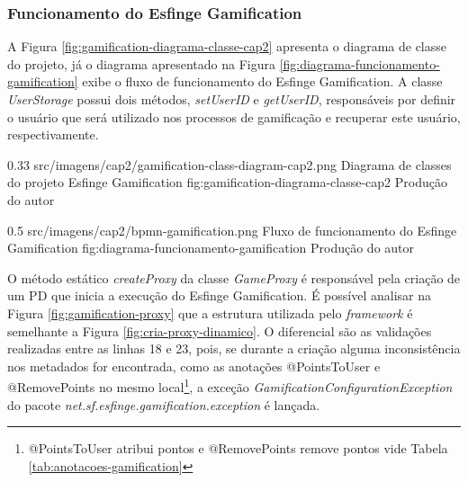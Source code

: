 \subsubsection{Funcionamento do Esfinge Gamification}

\par A Figura \ref{fig:gamification-diagrama-classe-cap2} apresenta o diagrama de classe do projeto, já o diagrama apresentado na Figura \ref{fig:diagrama-funcionamento-gamification} exibe o fluxo de funcionamento do Esfinge Gamification. A classe \textit{UserStorage} possui dois métodos, \textit{setUserID} e \textit{getUserID}, responsáveis por definir o usuário que será utilizado nos processos de gamificação e recuperar este usuário, respectivamente.

\begin{image}
{0.33} %
{src/imagens/cap2/gamification-class-diagram-cap2.png} %
{Diagrama de classes do projeto Esfinge Gamification} %
{fig:gamification-diagrama-classe-cap2} %
{Produção do autor} %
\end{image}

\begin{image}
{0.5} %
{src/imagens/cap2/bpmn-gamification.png} %
{Fluxo de funcionamento do Esfinge Gamification} %
{fig:diagrama-funcionamento-gamification} %
{Produção do autor} %
\end{image}

\par O método estático \textit{createProxy} da classe \textit{GameProxy} é responsável pela criação de um PD que inicia a execução do Esfinge Gamification. É possível analisar na Figura \ref{fig:gamification-proxy} que a estrutura utilizada pelo \textit{framework} é semelhante a Figura \ref{fig:cria-proxy-dinamico}. O diferencial são as validações realizadas entre as linhas 18 e 23, pois, se durante a criação alguma inconsistência nos metadados for encontrada, como as anotações @PointsToUser e  @RemovePoints no mesmo local\footnote{@PointsToUser atribui pontos e @RemovePoints remove pontos vide Tabela \ref{tab:anotacoes-gamification}}, a exceção \textit{GamificationConfigurationException} do pacote \textit{net.sf.esfinge.gamification.exception} é lançada. 

